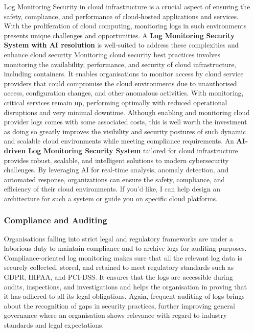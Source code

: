 Log Monitoring Security in cloud infrastructure is a crucial aspect of ensuring the safety, compliance, and performance of cloud-hosted applications and services. With the proliferation of cloud computing, monitoring logs in such environments presents unique challenges and opportunities. A \textbf{Log Monitoring Security System with AI resolution} is well-suited to address these complexities and enhance cloud security
Monitoring cloud security best practices involves monitoring the availability, performance, and security of cloud infrastructure, including containers.  It enables organisations to monitor access by cloud service providers that could compromise the cloud environments due to unauthorised access, configuration changes, and other anomalous activities. With monitoring, critical services remain up, performing optimally with reduced operational disruptions and very minimal downtime. Although enabling and monitoring cloud provider logs comes with some associated costs, this is well worth the investment as doing so greatly improves the visibility and security postures of such dynamic and scalable cloud environments while meeting compliance requirements\cite{8494085, Hyperstack-key, vaarandi2013comparative}.
An \textbf{AI-driven Log Monitoring Security System} tailored for cloud infrastructure provides robust, scalable, and intelligent solutions to modern cybersecurity challenges. By leveraging AI for real-time analysis, anomaly detection, and automated response, organizations can ensure the safety, compliance, and efficiency of their cloud environments. If you'd like, I can help design an architecture for such a system or guide you on specific cloud platforms.


\subsubsection{Compliance and Auditing} 

Organisations falling into strict legal and regulatory frameworks are under a laborious duty to maintain compliance and to archive logs for auditing purposes. Compliance-oriented log monitoring makes sure that all the relevant log data is securely collected, stored, and retained to meet regulatory standards such as GDPR, HIPAA, and PCI-DSS. It ensures that the logs are accessible during audits, inspections, and investigations and helps the organisation in proving that it has adhered to all its legal obligations. Again, frequent auditing of logs brings about the recognition of gaps in security practices, further improving general governance where an organisation shows relevance with regard to industry standards and legal expectations.\cite{massonet2011monitoring}

